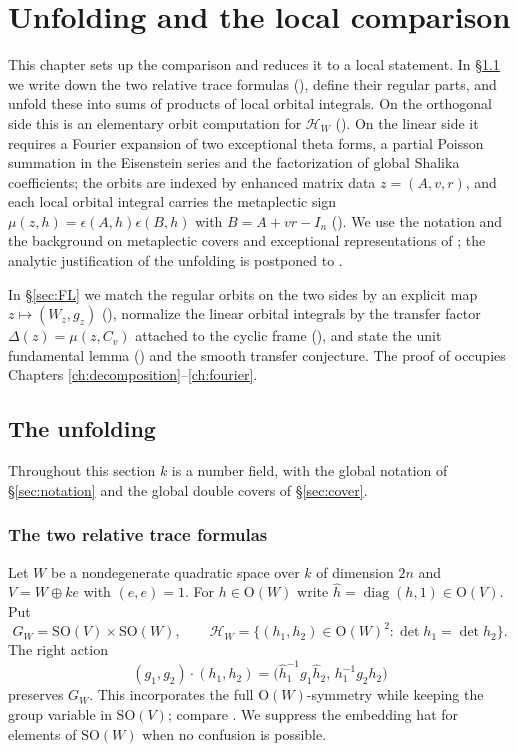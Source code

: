 \documentclass[11pt,oneside,notitlepage]{book}
\numberwithin{equation}{section}
\theoremstyle{plain}
\theoremstyle{definition}
\newcommand{\SO}{\mathrm{SO}}
\newcommand{\Ort}{\mathrm{O}}
\newcommand{\diag}{\operatorname{diag}}
\begin{document}
\chapter{Unfolding and the local comparison}\label{ch:unfolding}

This chapter sets up the comparison and reduces it to a local statement. In \S\ref{sec:unfolding} we write down the two relative trace formulas (), define their regular parts, and unfold these into sums of products of local orbital integrals. On the orthogonal side this is an elementary orbit computation for $\mathcal H_W$ (). On the linear side it requires a Fourier expansion of two exceptional theta forms, a partial Poisson summation in the Eisenstein series and the factorization of global Shalika coefficients; the orbits are indexed by enhanced matrix data $z=(A,v,r)$, and each local orbital integral carries the metaplectic sign $\mu(z,h)=\epsilon(A,h)\epsilon(B,h)$  with $B=A+vr-I_n$ (). We use the notation and the background on metaplectic covers and exceptional representations of ; the analytic justification of the unfolding is postponed to .

In \S\ref{sec:FL} we match the regular orbits on the two sides by an explicit map $z\mapsto(W_z,g_z)$ (), normalize the linear orbital integrals by the transfer factor $\Delta(z)=\mu(z,C_v)$ attached to the cyclic frame (), and state the unit fundamental lemma () and the smooth transfer conjecture. The proof of  occupies Chapters \ref{ch:decomposition}--\ref{ch:fourier}.




\section{The unfolding}\label{sec:unfolding}

Throughout this section $k$ is a number field, with the global notation of \S\ref{sec:notation} and the global double covers of \S\ref{sec:cover}.

\subsection*{The two relative trace formulas}

Let $W$ be a nondegenerate quadratic space over $k$ of dimension $2n$ and $V=W\oplus ke$ with $(e,e)=1$. For $h\in\Ort(W)$ write $\widehat h=\diag(h,1)\in\Ort(V)$. Put
\[
 G_W=\SO(V)\times\SO(W),\qquad
 \mathcal H_W=\{(h_1,h_2)\in\Ort(W)^2:\det h_1=\det h_2\}.
\]
The right action
\[
 (g_1,g_2)\cdot(h_1,h_2)
 =\bigl(\widehat h_1^{-1}g_1\widehat h_2,\,h_1^{-1}g_2h_2\bigr)
\]
preserves $G_W$. This incorporates the full $\Ort(W)$-symmetry while keeping the group variable in $\SO(V)$; compare \cite[\S4B]{Krishna}. We suppress the embedding hat for elements of $\SO(W)$ when no confusion is possible.
\end{document}
